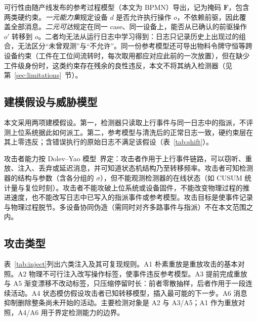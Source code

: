\documentclass[manuscript,screen,review]{acmart}
\begin{document}
可行性由随产线发布的参考过程模型（本文为 {BPMN}）导出，记为掩码 $\mathbf F$，包含两类硬约束。\emph{一元能力集}规定设备 $d$ 是否允许执行操作 $o$，不依赖前驱，因此覆盖全部消息。\emph{二元可达}规定在同一 case、同一设备上，能否从已确认的前驱操作 $o'$ 转移到 $o$。二者均无法从运行日志中学习得到：日志只记录历史上出现过的组合，无法区分``未曾观测''与``不允许''。同一份参考模型还可导出物料令牌守恒等跨设备约束（工件在工位间流转时，每次取用都应对应此前的一次放置），但在缺少工件级身份时，这类约束存在残余的良性违反，本文不将其纳入检测器（见第~\ref{sec:limitations}~节）。

\subsection{建模假设与威胁模型}
\label{sec:assumptions}

本文采用两项建模假设。第一，检测器只读取上行事件与同一日志中的指派，不评测上位系统据此如何派工。第二，参考模型与清洗后的正常日志一致，硬约束层在其上零违反；含错误执行的原始日志不满足该假设（表~\ref{tab:shift}）。

攻击者能力按 {Dolev--Yao} 模型~\cite{dolev1983yao}界定：攻击者作用于上行事件链路，可以窃听、重放、注入、丢弃或延迟消息，并可知道状态机结构乃至转移频率。攻击者可知检测器的结构与参数（含各分组的 $\sigma$），但不能观测检测器的在线状态（如 {CUSUM} 统计量与复位时刻）。攻击者不能攻破上位系统或设备固件，不能改变物理过程的推进速度，也不能改写日志中已写入的指派事件或参考模型。攻击目标是使事件记录与物理过程脱节。多设备协同伪造（需同时对齐多路事件与指派）不在本文范围之内。

\subsection{攻击类型}
\label{sec:coverage}

表~\ref{tab:inject}列出六类注入及其可复现规则。{A1} 朴素重放是重放攻击的基本对照。{A2} 物理不可行注入改写操作标签，使事件违反参考模型。{A3} 提前完成重放与 {A5} 渐变漂移不改动标签，只压缩停留时长：前者零散抽样，后者作用于一段连续活动。{A4} 状态模仿假设攻击者已知转移模型，插入最可能的下一步。{A6} 消息抑制删除整条尚未开始的活动。主要检测对象是 {A2} 与 {A3}/{A5}；{A1} 作为重放对照，{A4}/{A6} 用于界定检测能力的边界。
\end{document}
